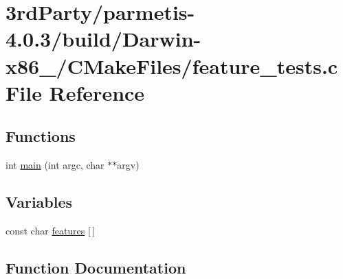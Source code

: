 \hypertarget{3rd_party_2parmetis-4_80_83_2build_2_darwin-x86__64_2_c_make_files_2feature__tests_8c}{}\section{3rd\+Party/parmetis-\/4.0.3/build/\+Darwin-\/x86\+\_/\+C\+Make\+Files/feature\+\_\+tests.c File Reference}
\label{3rd_party_2parmetis-4_80_83_2build_2_darwin-x86__64_2_c_make_files_2feature__tests_8c}
\subsection*{Functions}
\begin{DoxyCompactItemize}
\item 
int \hyperlink{3rd_party_2parmetis-4_80_83_2build_2_darwin-x86__64_2_c_make_files_2feature__tests_8c_a3c04138a5bfe5d72780bb7e82a18e627}{main} (int argc, char $\ast$$\ast$argv)
\end{DoxyCompactItemize}
\subsection*{Variables}
\begin{DoxyCompactItemize}
\item 
const char \hyperlink{3rd_party_2parmetis-4_80_83_2build_2_darwin-x86__64_2_c_make_files_2feature__tests_8c_a1582568e32f689337602a16bf8a5bff0}{features} \mbox{[}$\,$\mbox{]}
\end{DoxyCompactItemize}


\subsection{Function Documentation}
\mbox{\label{3rd_party_2parmetis-4_80_83_2build_2_darwin-x86__64_2_c_make_files_2feature__tests_8c_a3c04138a5bfe5d72780bb7e82a18e627}} 
